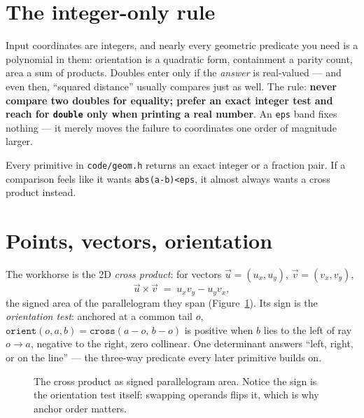 \section{The integer-only rule}\label{sec:intonly}
Input coordinates are integers, and nearly every geometric
predicate you need is a polynomial in them: orientation is a
quadratic form, containment a parity count, area a sum of
products. Doubles enter only if the \emph{answer} is real-valued
--- and even then, ``squared distance'' usually compares just as
well. The rule: \textbf{never compare two doubles for equality;
prefer an exact integer test and reach for \texttt{double} only
when printing a real number}. An \texttt{eps} band fixes nothing
--- it merely moves the failure to coordinates one order of
magnitude larger.

\begin{principle}\label{prin:geom}
Every primitive in \texttt{code/geom.h} returns an exact integer
or a fraction pair. If a comparison feels like it wants
\texttt{abs(a-b)<eps}, it almost always wants a cross product
instead.
\end{principle}

\section{Points, vectors, orientation}\label{sec:orient}
The workhorse is the 2D \emph{cross product}: for vectors
$\vec u=(u_x,u_y)$, $\vec v=(v_x,v_y)$,
\[
\vec u\times\vec v \;=\; u_x v_y-u_y v_x,
\]
the signed area of the parallelogram they span
(Figure~\ref{fig:orient}). Its sign is the \emph{orientation
test}: anchored at a common tail $o$,
$\texttt{orient}(o,a,b)=\texttt{cross}(a-o,\,b-o)$ is positive
when $b$ lies to the left of ray $o\to a$, negative to the right,
zero collinear. One determinant answers ``left, right, or on the
line'' --- the three-way predicate every later primitive builds
on.
\begin{figure}[ht]\centering

\caption{The cross product as signed parallelogram area. Notice
the sign is the orientation test itself: swapping operands flips
it, which is why anchor order matters.}
\label{fig:orient}
\end{figure}


